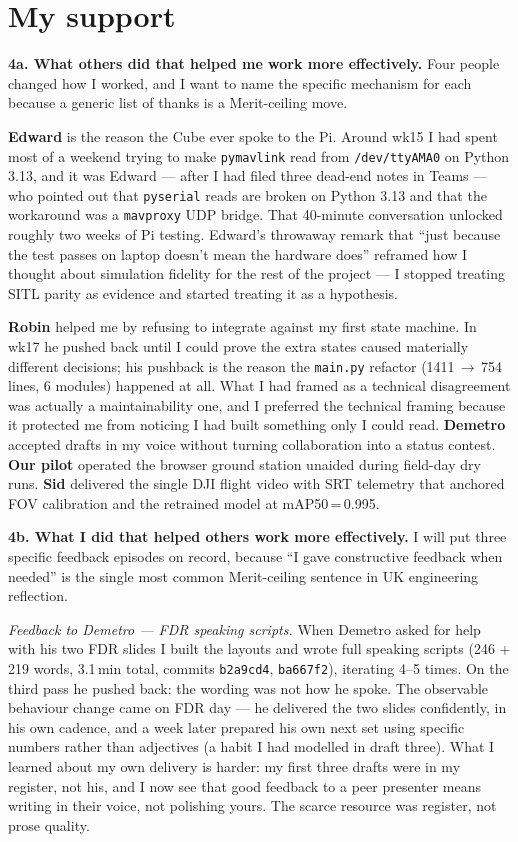\section{My support}

\textbf{4a. What others did that helped me work more effectively.} Four people changed how I worked, and I want to name the specific mechanism for each because a generic list of thanks is a Merit-ceiling move.

\textbf{Edward} is the reason the Cube ever spoke to the Pi. Around wk15 I had spent most of a weekend trying to make \texttt{pymavlink} read from \texttt{/dev/ttyAMA0} on Python 3.13, and it was Edward --- after I had filed three dead-end notes in Teams --- who pointed out that \texttt{pyserial} reads are broken on Python 3.13 and that the workaround was a \texttt{mavproxy} UDP bridge. That 40-minute conversation unlocked roughly two weeks of Pi testing. Edward's throwaway remark that ``just because the test passes on laptop doesn't mean the hardware does'' reframed how I thought about simulation fidelity for the rest of the project --- I stopped treating SITL parity as evidence and started treating it as a hypothesis.

\textbf{Robin} helped me by refusing to integrate against my first state machine. In wk17 he pushed back until I could prove the extra states caused materially different decisions; his pushback is the reason the \texttt{main.py} refactor (1411\,$\to$\,754 lines, 6 modules) happened at all. What I had framed as a technical disagreement was actually a maintainability one, and I preferred the technical framing because it protected me from noticing I had built something only I could read. \textbf{Demetro} accepted drafts in my voice without turning collaboration into a status contest. \textbf{Our pilot} operated the browser ground station unaided during field-day dry runs. \textbf{Sid} delivered the single DJI flight video with SRT telemetry that anchored FOV calibration and the retrained model at mAP50\,=\,0.995.

\textbf{4b. What I did that helped others work more effectively.} I will put three specific feedback episodes on record, because ``I gave constructive feedback when needed'' is the single most common Merit-ceiling sentence in UK engineering reflection.

\textit{Feedback to Demetro --- FDR speaking scripts.} When Demetro asked for help with his two FDR slides I built the layouts and wrote full speaking scripts (246 + 219 words, 3.1\,min total, commits \texttt{b2a9cd4}, \texttt{ba667f2}), iterating 4--5 times. On the third pass he pushed back: the wording was not how he spoke. The observable behaviour change came on FDR day --- he delivered the two slides confidently, in his own cadence, and a week later prepared his own next set using specific numbers rather than adjectives (a habit I had modelled in draft three). What I learned about my own delivery is harder: my first three drafts were in my register, not his, and I now see that good feedback to a peer presenter means writing in their voice, not polishing yours. The scarce resource was register, not prose quality.


